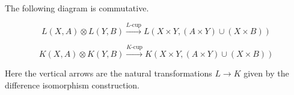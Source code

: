 The following diagram is commutative.

$$L(X, A) \otimes L(Y, B) \xrightarrow{L\text{-cup}} L(X \times Y, (A \times Y) \cup (X \times B))$$

$$K(X, A) \otimes K(Y, B) \xrightarrow{K\text{-cup}} K(X \times Y, (A \times Y) \cup (X \times B))$$

Here the vertical arrows are the natural transformations $L \to K$ given by the difference isomorphism construction.
